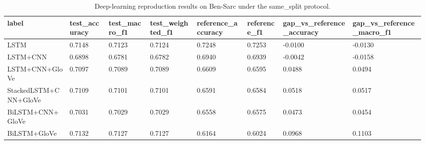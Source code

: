 \begin{table}
\caption{Deep-learning reproduction results on Ben-Sarc under the same_split protocol.}
\label{tab:dl-reproduction-same-split}
\begin{tabular}{llllllll}
\toprule
label & test_accuracy & test_macro_f1 & test_weighted_f1 & reference_accuracy & reference_f1 & gap_vs_reference_accuracy & gap_vs_reference_macro_f1 \\
\midrule
LSTM & 0.7148 & 0.7123 & 0.7124 & 0.7248 & 0.7253 & -0.0100 & -0.0130 \\
LSTM+CNN & 0.6898 & 0.6781 & 0.6782 & 0.6940 & 0.6939 & -0.0042 & -0.0158 \\
LSTM+CNN+GloVe & 0.7097 & 0.7089 & 0.7089 & 0.6609 & 0.6595 & 0.0488 & 0.0494 \\
StackedLSTM+CNN+GloVe & 0.7109 & 0.7101 & 0.7101 & 0.6591 & 0.6584 & 0.0518 & 0.0517 \\
BiLSTM+CNN+GloVe & 0.7031 & 0.7029 & 0.7029 & 0.6558 & 0.6575 & 0.0473 & 0.0454 \\
BiLSTM+GloVe & 0.7132 & 0.7127 & 0.7127 & 0.6164 & 0.6024 & 0.0968 & 0.1103 \\
\bottomrule
\end{tabular}
\end{table}
